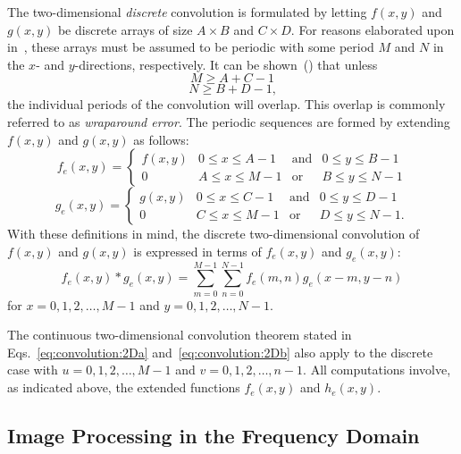 The two-dimensional {\em discrete\/} convolution is formulated by
letting $f(x,y)$ and $g(x,y)$ be discrete arrays of size $A\times B$
and $C\times D$.  For reasons elaborated upon in~\cite{brigham}, these
arrays must be assumed to be periodic with some period $M$ and $N$ in
the $x$- and $y$-directions, respectively.  It can be
shown~(\cite{brigham}) that unless
\begin{equation}
  M\geq A+C-1
\end{equation}
\begin{equation}
  N\geq B+D-1\mbox{,}
\end{equation}
the individual periods of the convolution will overlap.  This overlap
is commonly referred to as {\em wraparound error\/}.  The periodic
sequences are formed by extending $f(x,y)$ and $g(x,y)$ as follows:
\begin{equation}
  f_{e}(x,y)=\left\{
    \begin{array}{llll}
      f(x,y) & 0\leq x\leq A-1 & \mbox{and} & 0\leq y\leq B-1 \\
      0      & A\leq x\leq M-1 & \mbox{or}  & B\leq y\leq N-1
    \end{array} \right.
\end{equation}
\begin{equation}
  g_{e}(x,y)=\left\{
    \begin{array}{llll}
      g(x,y) & 0\leq x\leq C-1 & \mbox{and} & 0\leq y\leq D-1 \\
      0      & C\leq x\leq M-1 & \mbox{or}  & D\leq y\leq N-1\mbox{.}
    \end{array} \right.
\end{equation}
With these definitions in mind, the discrete two-dimensional
convolution of $f(x,y)$ and $g(x,y)$ is expressed in terms of
$f_{e}(x,y)$ and $g_{e}(x,y)$:
\begin{equation}
  f_{e}(x,y)\ast g_{e}(x,y)=\sum_{m=0}^{M-1}\sum_{n=0}^{N-1}
  f_{e}(m,n)g_{e}(x-m,y-n)
\end{equation}
for $x=0,1,2,\ldots,M-1$ and $y=0,1,2,\ldots,N-1$.

The continuous two-dimensional convolution theorem stated in
Eqs.~\ref{eq:convolution:2Da} and~\ref{eq:convolution:2Db} also apply
to the discrete case with $u=0,1,2,\ldots,M-1$ and
$v=0,1,2,\ldots,n-1$.  All computations involve, as indicated above,
the extended functions $f_{e}(x,y)$ and $h_{e}(x,y)$.

\subsection{Image Processing in the Frequency Domain}
\label{image:frequency:image}


